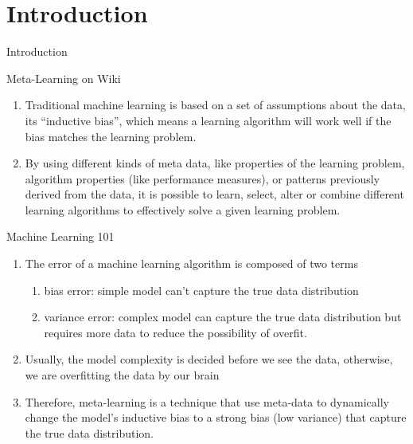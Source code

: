\documentclass[compress]{beamer}
\begin{document}
\section{Introduction}
\begin{frame}[allowframebreaks]{Introduction}
    \begin{block}{Meta-Learning on Wiki}
        \begin{enumerate}
            \item Traditional machine learning is based on a set of assumptions about the data, its ``inductive bias'', which means a learning algorithm will work well if the bias matches the learning problem.
            \item By using different kinds of meta data, like properties of the learning problem, algorithm properties (like performance measures), or patterns previously derived from the data, it is possible to learn, select, alter or combine different learning algorithms to effectively solve a given learning problem.
        \end{enumerate}
    \end{block}
    \begin{block}{Machine Learning 101}
        \begin{enumerate}
            \item The error of a machine learning algorithm is composed of two terms
                \begin{enumerate}
                    \item bias error: simple model can't capture the true data distribution
                    \item variance error: complex model can capture the true data distribution but requires more data to reduce the possibility of overfit.
                \end{enumerate}
            \item Usually, the model complexity is decided before we see the data, otherwise, we are overfitting the data by our brain
            \item Therefore, meta-learning is a technique that use meta-data to dynamically change the model's inductive bias to a strong bias (low variance) that capture the true data distribution.
        \end{enumerate}
    \end{block}


\end{frame}
\end{document}

